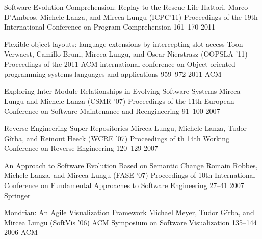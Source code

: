 \begin{enumerate}



\densepap
	{Software Evolution Comprehension: Replay to the Rescue}
	{Lile Hattori, Marco D'Ambros, Michele Lanza, and Mircea Lungu}
	{(ICPC'11) Proceedings of the 19th International Conference on Program Comprehension }
	{161--170}
	{2011}
	{\IEEE}



\densepap
	{Flexible object layouts: language extensions by intercepting slot access}
	{Toon Verwaest, Camillo Bruni, Mircea Lungu, and Oscar Nierstrasz}
	{(OOPSLA '11) Proceedings of the 2011 ACM international conference on Object oriented programming systems languages and applications }
	{959--972}
	{2011}
	{ACM}




\densepap
	{Exploring Inter-Module Relationships in Evolving Software Systems}
	{Mircea Lungu and Michele Lanza}
	{(CSMR '07) Proceedings of the 11th European Conference on Software Maintenance and Reengineering }
	{91--100}
	{2007}
	{\IEEE}

\densepap
	{Reverse Engineering Super-Repositories}
	{Mircea Lungu, Michele Lanza, Tudor G\^irba, and Reinout Heeck}
	{(WCRE '07) Proceedings of th 14th Working Conference on Reverse Engineering}
	{120--129}
	{2007}
	{\IEEE}

\densepap
	{An Approach to Software Evolution Based on Semantic Change}
	{Romain Robbes, Michele Lanza, and Mircea Lungu}
	{(FASE '07) Proceedings of 10th International Conference on Fundamental Approaches to Software Engineering}
	{27--41}
	{2007}
	{Springer}


\densepap
	{Mondrian: An Agile Visualization Framework}
	{Michael Meyer, Tudor G\^irba, and Mircea Lungu}
	{(SoftVis '06) ACM Symposium on Software Visualization}
	{135--144}
	{2006}
	{ACM}

\end{enumerate}